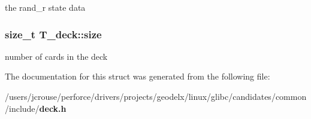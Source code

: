 the rand\_\-r state data 
\subsubsection{\setlength{\rightskip}{0pt plus 5cm}size\_\-t T\_\-deck::size}\label{structT__deck_m1}


number of cards in the deck 

The documentation for this struct was generated from the following file:\begin{CompactItemize}
\item 
/users/jcrouse/perforce/drivers/projects/geodelx/linux/glibc/candidates/common/include/{\bf deck.h}\end{CompactItemize}
